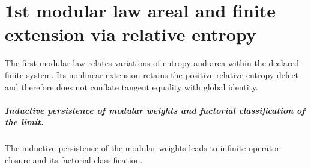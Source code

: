 \chapter{1st modular law areal and finite extension via relative entropy}
\label{chap:parte-iv-61}

The first modular law relates variations of entropy and area within the declared finite system. Its nonlinear extension retains the positive relative-entropy defect and therefore does not conflate tangent equality with global identity.



\paragraph{Inductive persistence of modular weights and factorial classification of the limit.} The inductive persistence of the modular weights leads to infinite operator closure and its factorial classification.
